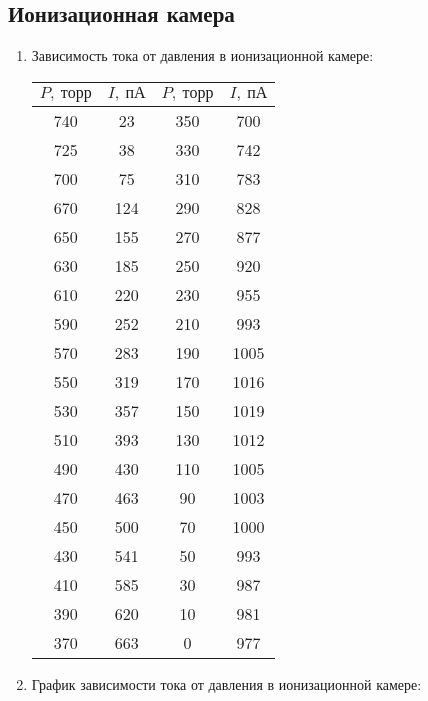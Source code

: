\documentclass{lab}
\begin{document}
\subsection*{Ионизационная камера}

\begin{enumerate}

\item
Зависимость тока от давления в ионизационной камере:
\begin{table}[H]
	\centering
	\begin{tabular}{|cc|cc|}
		\hline
		$ P,~торр $ & $ I,~пА $ & $ P,~торр $ & $ I,~пА $ \\ \hline
		740&	23	&350	&700\\
		725&	38	&330	&742\\
		700&	75	&310	&783\\
		670&	124	&290	&828\\
		650&	155	&270	&877\\
		630&	185	&250	&920\\
		610&	220	&230	&955\\
		590&	252	&210	&993\\
		570&	283	&190	&1005\\
		550&	319	&170	&1016\\
		530&	357	&150	&1019\\
		510&	393	&130	&1012\\
		490&	430	&110	&1005\\
		470&	463	&90		&1003\\
		450&	500	&70		&1000\\
		430&	541	&50		&993\\
		410&	585	&30		&987\\
		390&	620	&10		&981\\
		370&	663	&0		&977\\
		\hline
		
	\end{tabular}
	\label{tab2}
\end{table}

\newpage
\item
График зависимости тока от давления в ионизационной камере:

\begin{figure}[H]
	\centering
\end{figure}
\end{enumerate}
\end{document}

